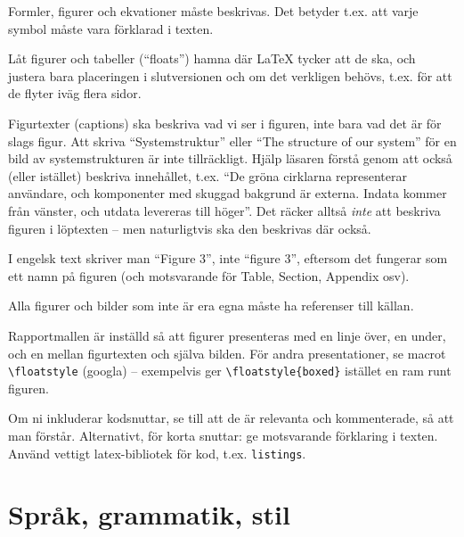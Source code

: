 Formler, figurer och ekvationer måste beskrivas.  Det betyder t.ex. att varje symbol måste vara förklarad i texten.

Låt figurer och tabeller (``floats'') hamna där La\TeX{} tycker att de ska, och justera bara placeringen i slutversionen och om det verkligen behövs, t.ex. för att de flyter iväg flera sidor.

Figurtexter (captions) ska beskriva vad vi ser i figuren, inte bara vad det är för slags figur. Att skriva ``Systemstruktur'' eller ``The structure of our system'' för en bild av systemstrukturen är inte tillräckligt. Hjälp läsaren förstå genom att också (eller istället) beskriva innehållet, t.ex. ``De gröna cirklarna representerar användare, och komponenter med skuggad bakgrund är externa. Indata kommer från vänster, och utdata levereras till höger''. Det räcker alltså \emph{inte} att beskriva figuren i löptexten -- men naturligtvis ska den beskrivas där också.

\label{figurers-namn}
I engelsk text skriver man ``Figure 3'', inte ``figure 3'', eftersom det fungerar som ett namn på figuren (och motsvarande för Table, Section, Appendix osv).

Alla figurer och bilder som inte är era egna måste ha referenser till källan.

Rapportmallen är inställd så att figurer presenteras med en linje över, en under, och en mellan figurtexten och själva bilden. För andra presentationer, se macrot \verb|\floatstyle| (googla) -- exempelvis ger \verb|\floatstyle{boxed}| istället en ram runt figuren.

Om ni inkluderar kodsnuttar, se till att de är relevanta och kommenterade, så att man förstår.  Alternativt, för korta snuttar: ge motsvarande förklaring i texten.
Använd vettigt latex-bibliotek för kod, t.ex. \texttt{listings}.

\section{Språk, grammatik, stil}
\label{sec:sprak-och-grammatik}

